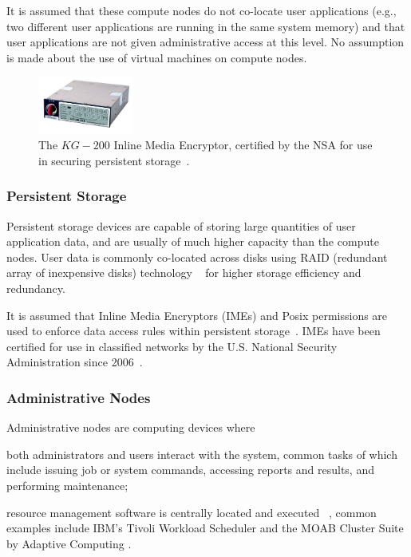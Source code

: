 \documentclass{llncs}
\begin{document}
It is assumed that these compute nodes do not co-locate user applications (e.g., two different user applications are running in the same system memory) and that user applications are not given administrative access at this level. No assumption is made about the use of virtual machines on compute nodes.

\begin{figure}
 \vspace{-25pt}
  \begin{center}
    \includegraphics[width=0.28\textwidth]{inline_media_encryptor.jpg}
  \end{center}
  \caption{The $KG-200$ Inline Media Encryptor, certified by the NSA for use in securing persistent storage~\cite{nsa_ime_website}.}
\label{fig:inline_media_encryptor}
\vspace{-25pt}
\end{figure}

\subsubsection{Persistent Storage}
Persistent storage devices are capable of storing large quantities of user application data, and are usually of much higher capacity than the compute nodes. User data is commonly co-located across disks using RAID (redundant array of inexpensive disks) technology ~\cite{katz1989disk} for higher storage efficiency and redundancy. 

It is assumed that Inline Media Encryptors (IMEs) and Posix permissions are used to enforce data access rules within persistent storage~\cite{nsa_ime}. IMEs have been certified for use in classified networks by the U.S. National Security Administration since 2006~\cite{nsa_ime_website}. 

\subsubsection{Administrative Nodes}
Administrative nodes are computing devices where \begin{inparaenum}
\item both administrators and users interact with the system, common tasks of which include issuing job or system commands, accessing reports and results, and performing maintenance;
\item resource management software is centrally located and executed ~\cite{keller2001anatomy}, common examples include IBM's Tivoli Workload Scheduler and the MOAB Cluster Suite by Adaptive Computing \cite{arackal2009access}\cite{jackson2006demand}.
\end{inparaenum}
\end{document}
